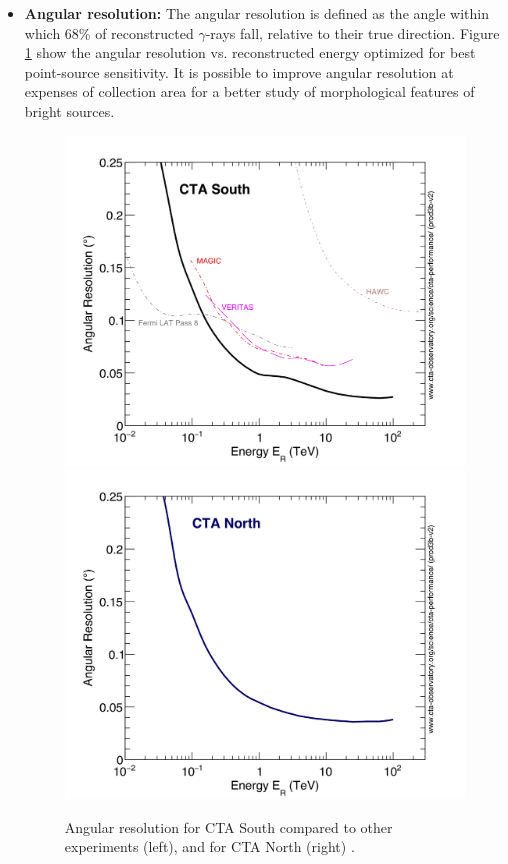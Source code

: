 \documentclass[main.tex]{subfiles}
\begin{document}
\begin{itemize}
\item \textbf{Angular resolution:} The angular resolution is defined as the angle within which 68\% of reconstructed $\gamma$-rays fall, relative to their true direction. Figure \ref{fig:angres} show the angular resolution vs. reconstructed energy optimized for best point-source sensitivity. It is possible to improve angular resolution at expenses of collection area for a better study of morphological features of bright sources.

  \begin{figure}[!htb]
    \includegraphics[width=\linewidth]{Pictures/CTA-Performance-prod3b-v2-Comparison-AngularResolution-OtherInstruments.pdf}
    \endminipage\hfill
    \includegraphics[width=\linewidth]{Pictures/CTA-Performance-prod3b-v2-North-20deg-AngularResolution.pdf}
    \endminipage\hfill
    \caption{\label{fig:angres} Angular resolution for CTA South compared to other experiments (left), and for CTA North (right) \cite{CTAPerformance}.}
  \end{figure}


\end{itemize}
\end{document}
